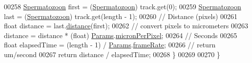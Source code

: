 \begin{DoxyCode}
00258     \hyperlink{classdata_1_1_spermatozoon}{Spermatozoon} first = (\hyperlink{classdata_1_1_spermatozoon}{Spermatozoon}) track.get(0);
00259     \hyperlink{classdata_1_1_spermatozoon}{Spermatozoon} last = (\hyperlink{classdata_1_1_spermatozoon}{Spermatozoon}) track.get(length - 1);
00260     \textcolor{comment}{// Distance (pixels)}
00261     \textcolor{keywordtype}{float} distance = last.\hyperlink{classdata_1_1_spermatozoon_aaef7a8e7602a08c82ea5fcbb777883e0}{distance}(first);
00262     \textcolor{comment}{// convert pixels to micrometers}
00263     distance = distance * (float) \hyperlink{classdata_1_1_params}{Params}.\hyperlink{classdata_1_1_params_a19331ee97ef3c422984fc7dff976549e}{micronPerPixel};
00264     \textcolor{comment}{// Seconds}
00265     \textcolor{keywordtype}{float} elapsedTime = (length - 1) / \hyperlink{classdata_1_1_params}{Params}.\hyperlink{classdata_1_1_params_a398ccb086e2e7150576bec8a5853b8e3}{frameRate};
00266     \textcolor{comment}{// return um/second}
00267     \textcolor{keywordflow}{return} distance / elapsedTime;
00268   \}
00269 
00270 \}
\end{DoxyCode}

